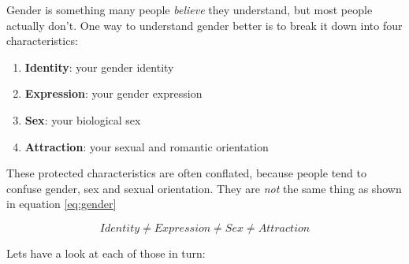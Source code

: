 \documentclass[
]{book}
\providecommand{\tightlist}{%
  \setlength{\itemsep}{0pt}\setlength{\parskip}{0pt}}
\begin{document}
Gender is something many people \emph{believe} they understand, but most people actually don't. One way to understand gender better is to break it down into four characteristics:

\begin{enumerate}
\def\labelenumi{\arabic{enumi}.}
\tightlist
\item
  \textbf{Identity}: your gender identity
\item
  \textbf{Expression}: your gender expression
\item
  \textbf{Sex}: your biological sex
\item
  \textbf{Attraction}: your sexual and romantic orientation
\end{enumerate}

These protected characteristics are often conflated, because people tend to confuse gender, sex and sexual orientation. They are \emph{not} the same thing as shown in equation \eqref{eq:gender}

\begin{equation}
Identity ≠ Expression ≠ Sex ≠ Attraction
  \label{eq:gender}
\end{equation}

Lets have a look at each of those in turn:
\end{document}
